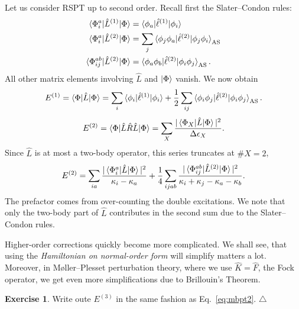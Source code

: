 \documentclass{report}
\theoremstyle{plain}
\theoremstyle{definition}
\newtheorem{exerc}{Exercise}[chapter]
\newcommand\xqed[1]{%
  \leavevmode\unskip\penalty9999 \hbox{}\nobreak\hfill
  \quad\hbox{#1}}
\newcommand\demo{\xqed{$\triangle$}}
\newenvironment{exercise}{\bigskip\begin{exerc}}{\demo\end{exerc}\bigskip}
\begin{document}
Let us consider RSPT up to second order. Recall first the
Slater--Condon rules:
\begin{align}
  \braket{\Phi_i^a|\hat{L}^{(1)}|\Phi} &=
  \braket{\phi_a|\hat{\ell}^{(1)}|\phi_i} \\
  \braket{\Phi_i^a|\hat{L}^{(2)}|\Phi} &=
  \sum_j \braket{\phi_j\phi_a|\hat{\ell}^{(2)}|\phi_j\phi_i}_\text{AS} \\
  \braket{\Phi_{ij}^{ab}|\hat{L}^{(2)}|\Phi} &=
  \braket{\phi_a\phi_b|\hat{\ell}^{(2)}|\phi_i\phi_j}_\text{AS}.
\end{align}
All other matrix elements involving $\hat{L}$ and $\ket{\Phi}$
vanish. We now obtain
\begin{equation}
  E^{(1)} = \braket{\Phi|\hat{L}|\Phi} = \sum_i
  \braket{\phi_i|\hat{\ell}^{(1)}|\phi_i} + \frac{1}{2}\sum_{ij} \braket{\phi_i\phi_j|\hat{\ell}^{(2)}|\phi_i\phi_j}_\text{AS}.
\end{equation}
\begin{equation}
  E^{(2)} = \braket{\Phi|\hat{L}\hat{R}\hat{L}|\Phi} = \sum_X
  \frac{|\braket{\Phi_X|\hat{L}|\Phi}|^2}{\Delta \epsilon_X}.
\end{equation}
Since $\hat{L}$ is at most a two-body operator, this series truncates
at $\#X = 2$,
\begin{equation}
  E^{(2)} = \sum_{ia}
  \frac{|\braket{\Phi_i^a|\hat{L}|\Phi}|^2}{\kappa_i - \kappa_a} +
  \frac{1}{4}\sum_{ijab}
  \frac{|\braket{\Phi_{ij}^{ab}|\hat{L}^{(2)}|\Phi}|^2}{\kappa_i +
    \kappa_j - \kappa_a - \kappa_b}.\label{eq:mbpt2}
\end{equation}
The prefactor comes from over-counting the double excitations. We note
that only the two-body part of $\hat{L}$ contributes in the second sum
due to the Slater--Condon rules.

Higher-order corrections quickly become more complicated. We shall
see, that using the \emph{Hamiltonian on normal-order form} will
simplify matters a lot. Moreover, in Møller--Plesset perturbation
theory, where we use $\hat{K} = \hat{F}$, the Fock operator, we get
even more simplifications due to Brillouin's Theorem.

\begin{exercise}
  Write oute $E^{(3)}$ in the same fashion as
  Eq.~\eqref{eq:mbpt2}.
\end{exercise}
\end{document}
